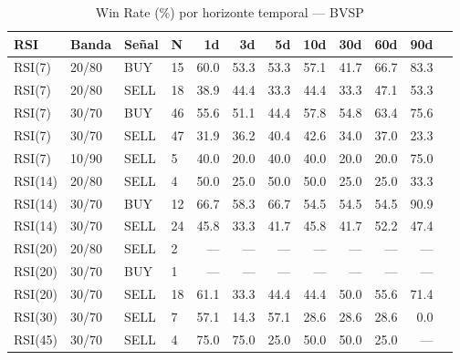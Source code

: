 %
\begin{table}[htbp]
    \centering
    \caption{Win Rate (\%) por horizonte temporal --- BVSP}
    \label{tab:winrate_bvsp}
    \small
    \begin{tabular}{llllrrrrrrrr}
        \toprule
        \textbf{RSI} & \textbf{Banda} & \textbf{Se\~{n}al} & \textbf{N} & \textbf{1d} & \textbf{3d} & \textbf{5d} & \textbf{10d} & \textbf{30d} & \textbf{60d} & \textbf{90d} \\
        \midrule
        RSI(7) & 20/80 & BUY & 15 & 60.0 & 53.3 & 53.3 & 57.1 & 41.7 & 66.7 & 83.3 \\
        RSI(7) & 20/80 & SELL & 18 & 38.9 & 44.4 & 33.3 & 44.4 & 33.3 & 47.1 & 53.3 \\
        RSI(7) & 30/70 & BUY & 46 & 55.6 & 51.1 & 44.4 & 57.8 & 54.8 & 63.4 & 75.6 \\
        RSI(7) & 30/70 & SELL & 47 & 31.9 & 36.2 & 40.4 & 42.6 & 34.0 & 37.0 & 23.3 \\
        RSI(7) & 10/90 & SELL & 5 & 40.0 & 20.0 & 40.0 & 40.0 & 20.0 & 20.0 & 75.0 \\
        \midrule
        RSI(14) & 20/80 & SELL & 4 & 50.0 & 25.0 & 50.0 & 50.0 & 25.0 & 25.0 & 33.3 \\
        RSI(14) & 30/70 & BUY & 12 & 66.7 & 58.3 & 66.7 & 54.5 & 54.5 & 54.5 & 90.9 \\
        RSI(14) & 30/70 & SELL & 24 & 45.8 & 33.3 & 41.7 & 45.8 & 41.7 & 52.2 & 47.4 \\
        \midrule
        RSI(20) & 20/80 & SELL & 2 & --- & --- & --- & --- & --- & --- & --- \\
        RSI(20) & 30/70 & BUY & 1 & --- & --- & --- & --- & --- & --- & --- \\
        RSI(20) & 30/70 & SELL & 18 & 61.1 & 33.3 & 44.4 & 44.4 & 50.0 & 55.6 & 71.4 \\
        \midrule
        RSI(30) & 30/70 & SELL & 7 & 57.1 & 14.3 & 57.1 & 28.6 & 28.6 & 28.6 & 0.0 \\
        \midrule
        RSI(45) & 30/70 & SELL & 4 & 75.0 & 75.0 & 25.0 & 50.0 & 50.0 & 25.0 & --- \\
        \bottomrule
    \end{tabular}
\end{table}
